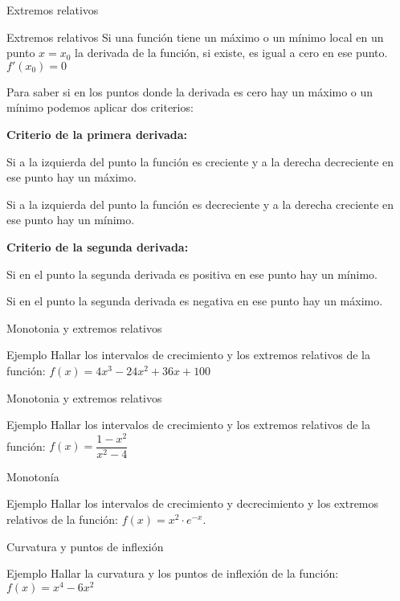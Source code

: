 \documentclass[8pt]{beamer}
\begin{document}
\begin{frame}[t]{Extremos relativos}
\begin{alertblock}{Extremos relativos}
Si una función tiene un máximo o un mínimo local en un punto $x=x_0$ la derivada de la función, si existe, es igual a cero en ese punto. $f'(x_0)=0 $
\end{alertblock}

\pause
Para saber si en los puntos donde la derivada es cero hay un máximo o un mínimo podemos aplicar dos criterios:

\pause
\textbf{Criterio de la primera derivada:}

\pause
Si a la izquierda del punto la función es creciente y a la derecha decreciente en ese punto hay un máximo.

\pause
Si a la izquierda del punto la función es decreciente y a la derecha creciente en ese punto hay un mínimo.

\pause
\textbf{Criterio de la segunda derivada:}

\pause
Si en el punto la segunda derivada es positiva en ese punto hay un mínimo.

\pause
Si en el punto la segunda derivada es negativa en ese punto hay un máximo.
\end{frame}

\begin{frame}[t]{Monotonia y extremos relativos}
\begin{exampleblock}{Ejemplo}
Hallar los intervalos de crecimiento y los extremos relativos de la función: $f(x)=4x^3-24x^2+36x+100$
\end{exampleblock}
\end{frame}

\begin{frame}[t]{Monotonia y extremos relativos}
\begin{exampleblock}{Ejemplo}
Hallar los intervalos de crecimiento y los extremos relativos de la función: $f(x)=\dfrac{1-x^2}{x^2-4}$
\end{exampleblock}
\end{frame}


\begin{frame}[t]{Monotonía}
\begin{exampleblock}{Ejemplo}
Hallar los intervalos de crecimiento y decrecimiento y los extremos relativos de la función: $f(x)=x^2 \cdot e^{-x}$.
\end{exampleblock}
\end{frame}


\begin{frame}[t]{Curvatura y puntos de inflexión}
\begin{exampleblock}{Ejemplo}
Hallar la curvatura y los puntos de inflexión de la función: $f(x)=x^4-6x^2$
\end{exampleblock}
\end{frame}
\end{document}
